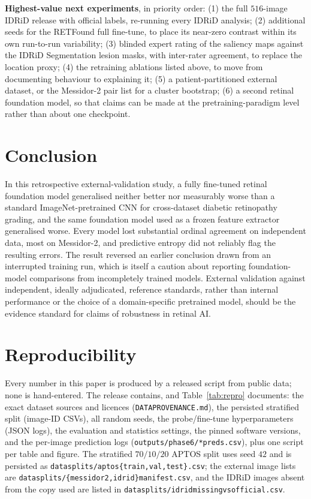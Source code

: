 \documentclass[journal]{IEEEtran}
\renewcommand{\_}{\origunderscore\allowbreak}
\begin{document}
\textbf{Highest-value next experiments}, in priority order:
(1) the full $516$-image IDRiD release with official labels, re-running every
IDRiD analysis;
(2) additional seeds for the RETFound full fine-tune, to place its near-zero
contrast within its own run-to-run variability;
(3) blinded expert rating of the saliency maps against the IDRiD Segmentation
lesion masks, with inter-rater agreement, to replace the location proxy;
(4) the retraining ablations listed above, to move from documenting behaviour to
explaining it;
(5) a patient-partitioned external dataset, or the Messidor-2 pair list for a
cluster bootstrap;
(6) a second retinal foundation model, so that claims can be made at the
pretraining-paradigm level rather than about one checkpoint.


\section{Conclusion}
\label{sec:conclusion}

In this retrospective external-validation study, a fully fine-tuned retinal
foundation model generalised neither better nor measurably worse than a standard
ImageNet-pretrained CNN for cross-dataset diabetic retinopathy grading, and the
same foundation model used as a frozen feature extractor generalised worse. Every
model lost substantial ordinal agreement on independent data, most on Messidor-2,
and predictive entropy did not reliably flag the resulting errors. The result
reversed an earlier conclusion drawn from an interrupted training run, which is
itself a caution about reporting foundation-model comparisons from incompletely
trained models. External validation against independent, ideally adjudicated,
reference standards, rather than internal performance or the choice of a
domain-specific pretrained model, should be the evidence standard for claims of
robustness in retinal AI.


\section{Reproducibility}
\label{sec:repro}

Every number in this paper is produced by a released script from public data; none
is hand-entered. The release contains, and Table~\ref{tab:repro} documents: the
exact dataset sources and licences (\texttt{DATA\_PROVENANCE.md}), the persisted
stratified split (image-ID CSVs), all random seeds, the probe/fine-tune
hyperparameters (JSON logs), the evaluation and statistics settings, the pinned
software versions, and the per-image prediction logs
(\texttt{outputs/\allowbreak{}phase6/\allowbreak{}*\_preds.csv}), plus one script per table and figure. The
stratified $70/10/20$ APTOS split uses seed $42$ and is persisted as
\texttt{data\_splits/\allowbreak{}aptos\_\{train,val,test\}.csv}; the external
image lists are \texttt{data\_splits/\allowbreak{}\{messidor2,idrid\}\_manifest.csv}, and
the IDRiD images absent from the copy used are listed in
\texttt{data\_splits/\allowbreak{}idrid\_missing\_vs\_official.csv}.
\end{document}
